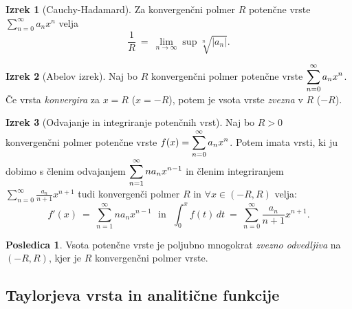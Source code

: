 \documentclass[11pt]{article}
\theoremstyle{definition}
\theoremstyle{definition}
\theoremstyle{definition}
\newtheorem{izrek}{Izrek}[section]
\theoremstyle{theorem}
\newtheorem*{posledica}{Posledica}
\begin{document}
\begin{izrek}[Cauchy-Hadamard]

Za konvergenčni polmer $R$ potenčne vrste $\sum_{n=0}^\infty a_n x^n$ velja
$$\frac{1}{R} ~=~ \lim_{n \rightarrow \infty} \sup{\sqrt[n]{|a_n|}}.$$

\end{izrek}
\vspace{0.5cm}

\begin{izrek}[Abelov izrek]

Naj bo $R$ konvergenčni polmer potenčne vrste $\mathlarger{\sum_{n=0}^\infty a_n x^n}$. Če vrsta \textit{konvergira} za $x = R$ ($x = -R$), potem je vsota vrste \textit{zvezna} v $R$ ($-R$).

\end{izrek}
\vspace{0.5cm}

\begin{izrek}[Odvajanje in integriranje potenčnih vrst]

Naj bo $R > 0$ \\\hbox{konvergenčni} polmer potenčne vrste $\mathlarger{f(x) = \sum_{n=0}^\infty a_n x^n}$. Potem imata vrsti, ki ju dobimo s členim odvajanjem $\mathlarger{\sum_{n=1}^\infty n a_n x^{n-1}}$ in členim integriranjem $\sum_{n=0}^\infty \frac{a_n}{n+1} x^{n+1}$ tudi konvergenči polmer $R$ in $\forall x \in (-R, R)$ velja:
$$f'(x) ~=~ \sum_{n=1}^\infty n a_n x^{n-1} ~~~\text{in}~~~ \int_0^x f(t)\,dt ~=~ \sum_{n=0}^\infty \frac{a_n}{n+1} x^{n+1}.$$

\end{izrek}
\vspace{0.5cm}

\begin{posledica}

Vsota potenčne vrste je poljubno mnogokrat \textit{zvezno odvedljiva} na $(-R, R)$, kjer je $R$ konvergenčni polmer vrste.

\end{posledica}
\vspace{0.5cm}


\subsection{Taylorjeva vrsta in analitične funkcije}
\vspace{0.5cm}
\end{document}
